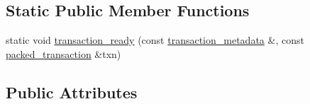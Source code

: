 \subsection*{Static Public Member Functions}
\begin{DoxyCompactItemize}
\item 
static void \mbox{\hyperlink{classaacio_1_1net__plugin__impl_a0ca5abb05defea1895bb63afaae7a4a9}{transaction\+\_\+ready}} (const \mbox{\hyperlink{classaacio_1_1chain_1_1transaction__metadata}{transaction\+\_\+metadata}} \&, const \mbox{\hyperlink{structaacio_1_1chain_1_1packed__transaction}{packed\+\_\+transaction}} \&txn)
\end{DoxyCompactItemize}
\subsection*{Public Attributes}
